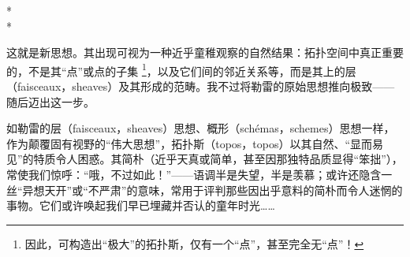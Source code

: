 \begin{center}
    * \quad * \\
    *
\end{center}

这就是新思想。其出现可视为一种近乎童稚观察的自然结果：拓扑空间中真正重要的，不是其“点”或点的子集 \footnote{因此，可构造出“极大”的拓扑斯，仅有一个“点”，甚至完全无“点”！}，以及它们间的邻近关系等，而是其上的层（faisceaux，sheaves）及其形成的范畴。我不过将勒雷的原始思想推向极致——随后迈出这一步。

如勒雷的层（faisceaux，sheaves）思想、概形（schémas，schemes）思想一样，作为颠覆固有视野的“伟大思想”，拓扑斯（topos，topos）以其自然、“显而易见”的特质令人困惑。其简朴（近乎天真或简单，甚至因那独特品质显得“笨拙”），常使我们惊呼：“哦，不过如此！”——语调半是失望，半是羡慕；或许还隐含一丝“异想天开”或“不严肃”的意味，常用于评判那些因出乎意料的简朴而令人迷惘的事物。它们或许唤起我们早已埋藏并否认的童年时光……